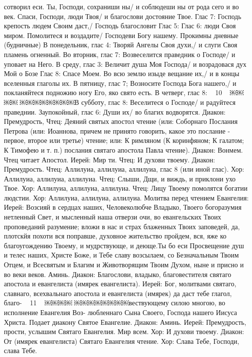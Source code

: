 сотворил еси.
Ты, Господи, сохраниши ны/ и соблюдеши ны от рода сего и
во век.
Спаси, Господи, люди Твоя/ и благослови достояние Твое.
Глас 7:
Господь крепость людем Своим даст,/ Господь благословит
Глас 5:
Глас 6:
люди Своя миром.
Помолитеся и воздадите/ Господеви Богу нашему.
Прокимны дневные (будничные) В понедельник, глас 4:
Творяй Ангелы Своя духи,/ и слуги Своя пламень огненный. Во вторник, глас 7:
Возвеселится праведник о Господе/ и уповает на Него.
В среду, глас 3:
Величит душа Моя Господа/ и возрадовася дух Мой о Бозе
Глас 8:
Спасе Моем.
Во всю землю изыде вещание их,/ и в концы вселенныя
глаголы их.
В пятницу, глас 7;
Возносите Господа Бога нашего,/ и покланяйтеся подножию
ногу Его, яко свято есть.
В четверг, глас 8:
~ 10 ~
￼￼￼￼
￼￼￼￼￼￼￼￼В субботу, глас 8:
Веселитеся о Господе/ и радуйтеся праведнии. Заупокойный, глас 6:
Души их/ во благих водворятся.
Диакон: Премудрость,
Чтец: Деяний святых апостол чтение (или: Соборнаго
Послания Петрова (или: Иоаннова, причем не принято говорить, какое это послание - первое, второе или третье) чтение; или: К римляном (К коринфяном; К галатом; К Тимофею и т. п.) послания святаго апостола Павла чтение).
Диакон: Вонмем.
Чтец читает Апостол.
Иерей: Мир ти.
Чтец: И духови твоему.
Диакон: Премудрость.
Чтец: Аллилуиа, аллилуиа, аллилуиа, глас 8 (или иной глас). Хор: Аллилуиа, аллилуиа, аллилуиа.
Чтец: Слыши, Дщи, и виждь, и приклони ухо Твое.
Хор: Аллилуиа, аллилуиа, аллилуиа.
Чтец: Лицу Твоему помолятся богатии людстии.
Хор: Аллилуиа, аллилуиа, аллилуиа.
Молитва перед чтением Евангелия:
Иерей: Возсияй в сердцах наших, Человеколюбче Владыко, Твоего богоразумия нетленный Свет, и мысленный наша отверзи очи, во евангельских Твоих проповеданий разумение; вложи в нас и страх блаженных Твоих заповедей, да, плотскйя похоти вся поправше, духовное жительство пройдем, вся, яже ко благоугождению Твоему, и мудрствующе, и деюще.Ты бо еси Просвещение душ и телес наших, Христе Боже, и Тебе славу возсылаем, со Безначальным Твоим Отцем, и Всесвятым и Благим и Животворящим Твоим Духом, ныне и присно и во веки веков. Аминь.
Диакон: Благослови, владыко, благовестителя святаго апостола и евангелиста (имярек евангелиста).
Иерей: Бог, молитвами святаго, славнаго, всехвальнаго апостола и евангелиста (имярек) да даст тебе глагол, благо-
~ 11 ~
￼￼￼￼
￼￼￼￼￼￼￼￼вествующему силою многою, во исполнение Евангелия Воз- любленнаго Сына Своего, Господа нашего Иисуса Христа.
Подает диакону Святое Евангелие.
Диакон: Аминь.
Иерей: Премудрость, прости, услышим Святаго Евангелия. Мир всем.
Хор: И духови твоему.
Диакон: От (имярек евангелиста) Святаго Евангелия чтение. Хор: Слава Тебе, Господи, слава Тебе.
